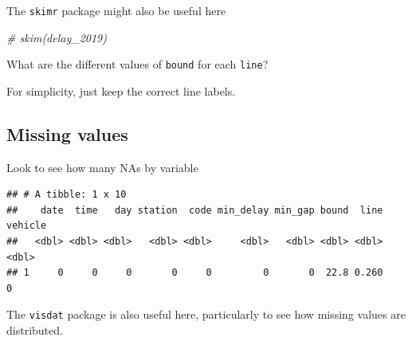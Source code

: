\documentclass[
]{book}
\newenvironment{Shaded}{\begin{snugshade}}{\end{snugshade}}
\newcommand{\CommentTok}[1]{\textcolor[rgb]{0.56,0.35,0.01}{\textit{#1}}}
\newcommand{\DataTypeTok}[1]{\textcolor[rgb]{0.13,0.29,0.53}{#1}}
\newcommand{\DecValTok}[1]{\textcolor[rgb]{0.00,0.00,0.81}{#1}}
\newcommand{\KeywordTok}[1]{\textcolor[rgb]{0.13,0.29,0.53}{\textbf{#1}}}
\newcommand{\NormalTok}[1]{#1}
\newcommand{\OperatorTok}[1]{\textcolor[rgb]{0.81,0.36,0.00}{\textbf{#1}}}
\newcommand{\StringTok}[1]{\textcolor[rgb]{0.31,0.60,0.02}{#1}}
\begin{document}
The \texttt{skimr} package might also be useful here

\begin{Shaded}
\begin{Highlighting}[]
\CommentTok{# skim(delay_2019)}
\end{Highlighting}
\end{Shaded}

What are the different values of \texttt{bound} for each \texttt{line}?

For simplicity, just keep the correct line labels.

\begin{Shaded}
\end{Shaded}

\hypertarget{missing-values}{%
\subsection{Missing values}\label{missing-values}}

Look to see how many NAs by variable

\begin{Shaded}
\end{Shaded}

\begin{verbatim}
## # A tibble: 1 x 10
##    date  time   day station  code min_delay min_gap bound  line vehicle
##   <dbl> <dbl> <dbl>   <dbl> <dbl>     <dbl>   <dbl> <dbl> <dbl>   <dbl>
## 1     0     0     0       0     0         0       0  22.8 0.260       0
\end{verbatim}

The \texttt{visdat} package is also useful here, particularly to see how missing values are distributed.
\end{document}
